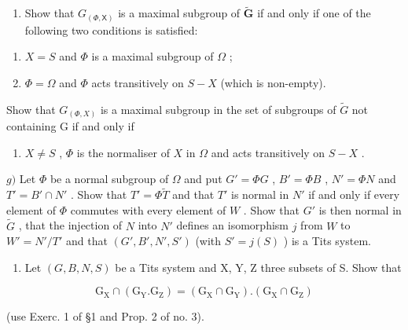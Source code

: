 \begin{enumerate}
\def\labelenumi{\alph{enumi})}
\setcounter{enumi}{5}
\tightlist
\item
  Show that \(G_{(\Phi, \mathsf{X})}\) is a maximal subgroup of \(\tilde{\mathbf{G}}\) if and only if one of the following two conditions is satisfied:
\end{enumerate}

\begin{enumerate}
\def\labelenumi{(\roman{enumi})}
\item
  \(X = S\) and \(\varPhi\) is a maximal subgroup of \(\varOmega\) ;
\item
  \(\Phi = \Omega\) and \(\Phi\) acts transitively on \(S - X\) (which is non-empty).
\end{enumerate}

Show that \(G_{(\Phi,X)}\) is a maximal subgroup in the set of subgroups of \(\tilde{G}\) not containing G if and only if

\begin{enumerate}
\def\labelenumi{(\roman{enumi})}
\setcounter{enumi}{2}
\tightlist
\item
  \(X \neq S\) , \(\Phi\) is the normaliser of \(X\) in \(\Omega\) and acts transitively on \(S - X\) .
\end{enumerate}

\(g)\) Let \(\Phi\) be a normal subgroup of \(\Omega\) and put \(G' = \Phi G\) , \(B' = \Phi B\) , \(N' = \Phi N\) and \(T' = B' \cap N'\) . Show that \(T' = \Phi \tilde{T}\) and that \(T'\) is normal in \(N'\) if and only if every element of \(\Phi\) commutes with every element of \(W\) . Show that \(G'\) is then normal in \(\tilde{G}\) , that the injection of \(N\) into \(N'\) defines an isomorphism \(j\) from \(W\) to \(W' = N'/T'\) and that \((G', B', N', S')\) (with \(S' = j(S)\) ) is a Tits system.

\begin{enumerate}
\def\labelenumi{\arabic{enumi})}
\setcounter{enumi}{8}
\tightlist
\item
  Let \((G, B, N, S)\) be a Tits system and X, Y, Z three subsets of S. Show that
\end{enumerate}

\[
\mathrm{G} _ {\mathrm{X}} \cap (\mathrm{G} _ {\mathrm{Y}}. \mathrm{G} _ {\mathrm{Z}}) = (\mathrm{G} _ {\mathrm{X}} \cap \mathrm{G} _ {\mathrm{Y}}). (\mathrm{G} _ {\mathrm{X}} \cap \mathrm{G} _ {\mathrm{Z}})
\]

(use Exerc. 1 of §1 and Prop. 2 of no. 3).

